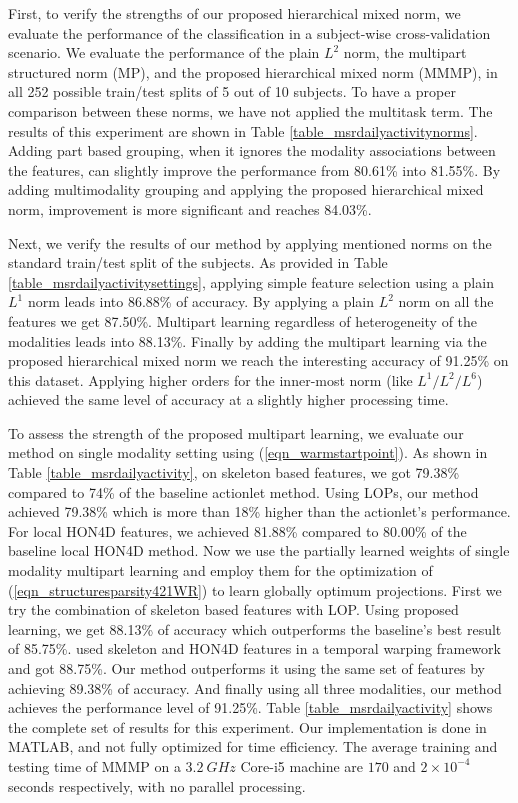 \documentclass[9pt,technote,compsoc]{IEEEtran}
\begin{document}
First, to verify the strengths of our proposed hierarchical mixed norm, we evaluate the performance of the classification in a subject-wise cross-validation scenario. We evaluate the performance of the plain $L^2$ norm, the multipart structured norm (MP), and the proposed hierarchical mixed norm (MMMP), in all 252 possible train/test splits of 5 out of 10 subjects. To have a proper comparison between these norms, we have not applied the multitask term. The results of this experiment are shown in Table \ref{table_msrdailyactivitynorms}. Adding part based grouping, when it ignores the modality associations between the features, can slightly improve the performance from 80.61\% into 81.55\%. By adding multimodality grouping and applying the proposed hierarchical mixed norm, improvement is more significant and reaches 84.03\%.

Next, we verify the results of our method by applying mentioned norms on the standard train/test split of the subjects. As provided in Table \ref{table_msrdailyactivitysettings}, applying simple feature selection using a plain $L^1$ norm leads into 86.88\% of accuracy. By applying a plain $L^2$ norm on all the features we get 87.50\%. Multipart learning regardless of heterogeneity of the modalities leads into 88.13\%. Finally by adding the multipart learning via the proposed hierarchical mixed norm we reach the interesting accuracy of 91.25\% on this dataset. Applying higher orders for the inner-most norm (like $L^1/L^2/L^6$) achieved the same level of accuracy at a slightly higher processing time.



To assess the strength of the proposed multipart learning, we evaluate our method on single modality setting using (\ref{eqn_warmstartpoint}). As shown in Table \ref{table_msrdailyactivity}, on skeleton based features, we got 79.38\% compared to 74\% of the baseline actionlet method. Using LOPs, our method achieved 79.38\% which is more than 18\% higher than the actionlet's performance. For local HON4D features, we achieved 81.88\% compared to 80.00\% of the baseline local HON4D method.
Now we use the partially learned weights of single modality multipart learning and employ them for the optimization of (\ref{eqn_structuresparsity421WR}) to learn globally optimum projections. First we try the combination of skeleton based features with LOP. Using proposed learning, we get 88.13\% of accuracy which outperforms the baseline's best result of 85.75\%. \cite{MMTW} used skeleton and HON4D features in a temporal warping framework and got 88.75\%. Our method outperforms it using the same set of features by achieving 89.38\% of accuracy. And finally using all three modalities, our method achieves the performance level of 91.25\%. Table \ref{table_msrdailyactivity} shows the complete set of results for this experiment. 
Our implementation is done in MATLAB, and not fully optimized for time efficiency. The average training and testing time of MMMP on a $3.2~GHz$ Core-i5 machine are $170$ and $2\times10^{-4}$ seconds respectively, with no parallel processing.
\end{document}
